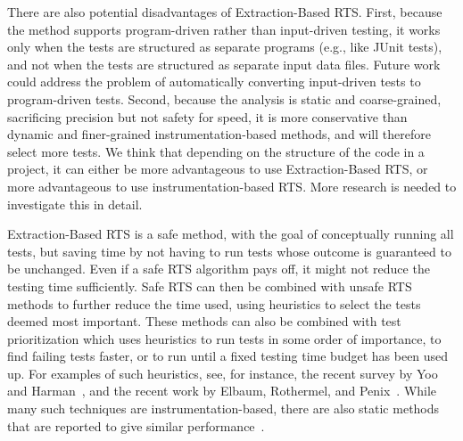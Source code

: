 {There are also potential disadvantages of Extraction-Based RTS. First, because the method supports
program-driven rather than input-driven testing, it works only when the tests are structured as
separate programs (e.g., like JUnit tests), and not when the tests are structured as separate input
data files. Future work could address the problem of automatically converting input-driven tests to
program-driven tests. Second, because the analysis is static and coarse-grained, sacrificing
precision but not safety for speed, it is more conservative than dynamic and finer-grained in\-stru\-men\-ta\-tion-based methods, and will therefore select more tests. We think that depending on the structure of the code in a project, it can either be more advantageous to use Extraction-Based RTS, or more advantageous to use instrumentation-based RTS. More research is needed to investigate this in detail.

Extraction-Based RTS is a safe method, with the goal of conceptually running all tests, but saving time by not having to run tests whose outcome is guaranteed to be unchanged. Even if a safe RTS algorithm pays off, it might not reduce the testing time sufficiently. Safe RTS can then be combined with unsafe RTS methods to further reduce the time used, using heuristics to select the tests deemed most important. These methods can also be combined with test prioritization which uses heuristics to run tests in some order of importance, to find failing tests faster, or to run until a fixed testing time budget has been used up. For examples of such heuristics, see, for instance, the recent survey by Yoo and Harman~\cite{yoo2012regression}, and the recent work by Elbaum, Rothermel, and Penix~\cite{elbaum2014techniques}. While many such techniques are instrumentation-based, there are also static methods that are reported to give similar performance~\cite{mei2012static}.











}
